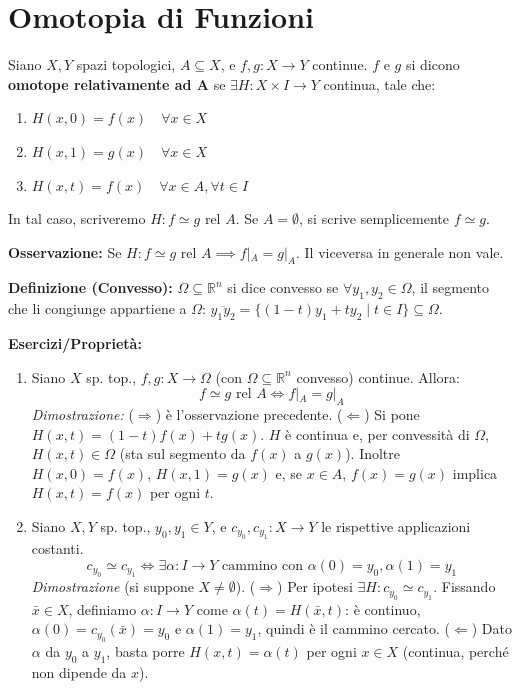 \section{Omotopia di Funzioni}
\begin{definicion} Siano $X, Y$ spazi topologici, $A \subseteq X$, e $f, g: X \to Y$ continue. $f$ e $g$ si dicono \textbf{omotope relativamente ad A} se $\exists H: X \times I \to Y$ continua, tale che:
\begin{enumerate}
    \item $H(x,0) = f(x) \quad \forall x \in X$
    \item $H(x,1) = g(x) \quad \forall x \in X$
    \item $H(x,t) = f(x) \quad \forall x \in A, \forall t \in I$
\end{enumerate}
\end{definicion}

In tal caso, scriveremo $H: f \simeq g \text{ rel } A$. Se $A = \emptyset$, si scrive semplicemente $f \simeq g$.

\textbf{Osservazione:} Se $H: f \simeq g \text{ rel } A \implies f|_A = g|_A$. Il viceversa in generale non vale.

\textbf{Definizione (Convesso):} $\Omega \subseteq \mathbb{R}^n$ si dice convesso se $\forall y_1, y_2 \in \Omega$, il segmento che li congiunge appartiene a $\Omega$: $\overline{y_1 y_2} = \{(1-t)y_1 + ty_2 \mid t \in I\} \subseteq \Omega$.

\textbf{Esercizi/Propriet\`a:}
\begin{enumerate}
    \item Siano $X$ sp. top., $f, g: X \to \Omega$ (con $\Omega \subseteq \mathbb{R}^n$ convesso) continue. Allora: 
    \[ f \simeq g \text{ rel } A \iff f|_A = g|_A \]
    \textit{Dimostrazione:} ($\Rightarrow$) \`e l'osservazione precedente. ($\Leftarrow$) Si pone $H(x,t) = (1-t)f(x) + tg(x)$. $H$ \`e continua e, per convessit\`a di $\Omega$, $H(x,t) \in \Omega$ (sta sul segmento da $f(x)$ a $g(x)$). Inoltre $H(x,0)=f(x)$, $H(x,1)=g(x)$ e, se $x \in A$, $f(x) = g(x)$ implica $H(x,t) = f(x)$ per ogni $t$.
    
    \item Siano $X, Y$ sp. top., $y_0, y_1 \in Y$, e $c_{y_0}, c_{y_1}: X \to Y$ le rispettive applicazioni costanti.
    \[ c_{y_0} \simeq c_{y_1} \iff \exists \alpha: I \to Y \text{ cammino con } \alpha(0)=y_0, \alpha(1)=y_1 \]
    \textit{Dimostrazione} (si suppone $X \neq \emptyset$). ($\Rightarrow$) Per ipotesi $\exists H: c_{y_0} \simeq c_{y_1}$. Fissando $\bar{x} \in X$, definiamo $\alpha: I \to Y$ come $\alpha(t) = H(\bar{x}, t)$: \`e continuo, $\alpha(0) = c_{y_0}(\bar x) = y_0$ e $\alpha(1) = y_1$, quindi \`e il cammino cercato.
    ($\Leftarrow$) Dato $\alpha$ da $y_0$ a $y_1$, basta porre $H(x,t) = \alpha(t)$ per ogni $x \in X$ (continua, perch\'e non dipende da $x$).
\end{enumerate}



